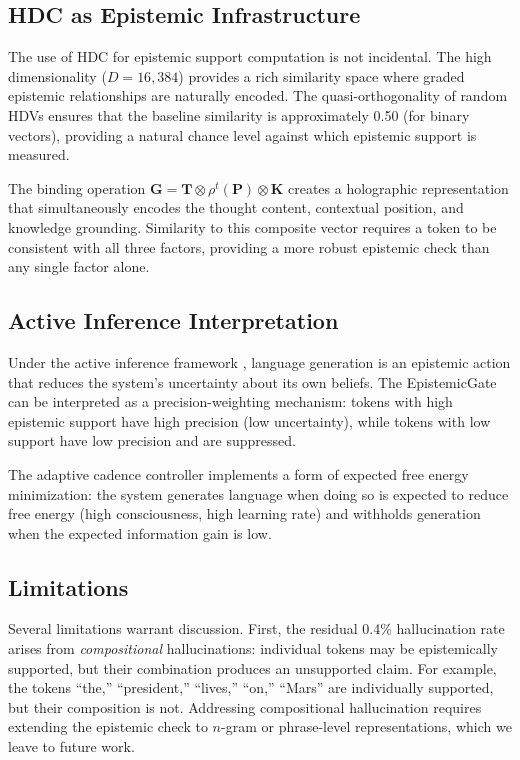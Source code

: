 \documentclass[12pt,a4paper]{article}
\begin{document}
\subsection{HDC as Epistemic Infrastructure}

The use of HDC for epistemic support computation is not incidental. The high dimensionality ($D = 16{,}384$) provides a rich similarity space where graded epistemic relationships are naturally encoded. The quasi-orthogonality of random HDVs ensures that the baseline similarity is approximately 0.50 (for binary vectors), providing a natural chance level against which epistemic support is measured.

The binding operation $\mathbf{G} = \mathbf{T} \otimes \rho^t(\mathbf{P}) \otimes \mathbf{K}$ creates a holographic representation that simultaneously encodes the thought content, contextual position, and knowledge grounding. Similarity to this composite vector requires a token to be consistent with all three factors, providing a more robust epistemic check than any single factor alone.

\subsection{Active Inference Interpretation}

Under the active inference framework \citep{friston2010free}, language generation is an epistemic action that reduces the system's uncertainty about its own beliefs. The EpistemicGate can be interpreted as a precision-weighting mechanism: tokens with high epistemic support have high precision (low uncertainty), while tokens with low support have low precision and are suppressed.

The adaptive cadence controller implements a form of expected free energy minimization: the system generates language when doing so is expected to reduce free energy (high consciousness, high learning rate) and withholds generation when the expected information gain is low.

\subsection{Limitations}
\label{sec:limitations}

Several limitations warrant discussion. First, the residual 0.4\% hallucination rate arises from \emph{compositional} hallucinations: individual tokens may be epistemically supported, but their combination produces an unsupported claim. For example, the tokens ``the,'' ``president,'' ``lives,'' ``on,'' ``Mars'' are individually supported, but their composition is not. Addressing compositional hallucination requires extending the epistemic check to $n$-gram or phrase-level representations, which we leave to future work.
\end{document}
